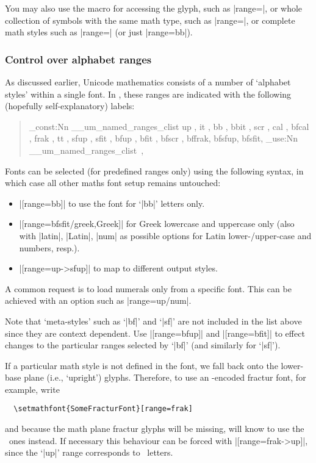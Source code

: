 You may also use the macro for accessing the glyph, such as |range=|, or whole collection of symbols with the same math type, such as |range=\mathopen|, or complete math styles such as |range=\symbb| (or just |range=bb|).

\subsubsection{Control over alphabet ranges}

As discussed earlier, Unicode mathematics consists of a number of `alphabet styles' within a single font. In , these ranges are indicated with the following (hopefully self-explanatory) labels:
\begin{quote}\ttfamily
\ExplSyntaxOn
\clist_const:Nn \g__um_named_ranges_clist {
up    ,
it    ,
bb    ,
bbit  ,
scr   ,
cal   ,
bfcal ,
frak  ,
tt    ,
sfup  ,
sfit  ,
bfup  ,
bfit  ,
bfscr ,
bffrak,
bfsfup,
bfsfit,
}
\clist_use:Nn \g__um_named_ranges_clist {\,,\,~}
\ExplSyntaxOff
\end{quote}
Fonts can be selected (for predefined ranges only) using the following syntax, in which case all other maths font setup remains untouched:
\begin{itemize}
\item |[range=bb]| to use the font for `|bb|' letters only.
\item |[range=bfsfit/{greek,Greek}]| for Greek lowercase and uppercase only (also with |latin|, |Latin|, |num| as possible options for Latin lower-/upper-case and numbers, resp.).
\item |[range=up->sfup]| to map to different output styles.
\end{itemize}

A common request is to load numerals only from a specific font. This can be
achieved with an option such as |range=up/{num}|.

Note that `meta-styles' such as `|bf|' and `|sf|' are not included in the list above since they are context dependent. Use |[range=bfup]| and |[range=bfit]| to effect changes to the particular ranges selected by `|bf|' (and similarly for `|sf|').

If a particular math style is not defined in the font, we fall back onto the lower-base plane (i.e., `upright') glyphs.
Therefore, to use an \ascii-encoded fractur font, for example, write
\begin{Verbatim}
  \setmathfont{SomeFracturFont}[range=frak]
\end{Verbatim}
and because the math plane fractur glyphs will be missing,  will know to use the \ascii\ ones instead.
If necessary this behaviour can be forced with |[range=frak->up]|, since the `|up|' range corresponds to \ascii\ letters.

